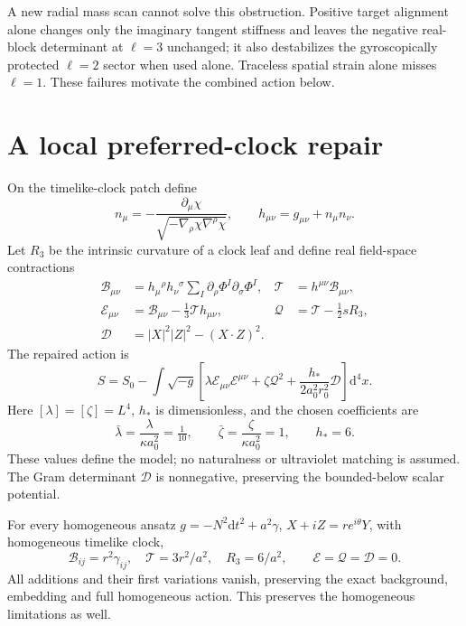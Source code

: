 \documentclass[11pt]{article}
\newcommand{\dd}{\mathrm d}
\numberwithin{equation}{section}
\begin{document}
A new radial mass scan cannot solve this obstruction.
Positive target alignment alone changes only the imaginary tangent stiffness and leaves the negative real-block determinant at $\ell=3$ unchanged; it also destabilizes the gyroscopically protected $\ell=2$ sector when used alone.
Traceless spatial strain alone misses $\ell=1$.
These failures motivate the combined action below.

\section{A local preferred-clock repair}

On the timelike-clock patch define
\begin{equation}
 n_\mu=-\frac{\partial_\mu\chi}{\sqrt{-\nabla_\rho\chi\nabla^\rho\chi}},\qquad
 h_{\mu\nu}=g_{\mu\nu}+n_\mu n_\nu.
\end{equation}
Let $R_3$ be the intrinsic curvature of a clock leaf and define real field-space contractions
\begin{align}
 \mathcal B_{\mu\nu}&=h_\mu{}^\rho h_\nu{}^\sigma\sum_I\partial_\rho\Phi^I\partial_\sigma\Phi^I,
 &\mathcal T&=h^{\mu\nu}\mathcal B_{\mu\nu},\\
 \mathcal E_{\mu\nu}&=\mathcal B_{\mu\nu}-\tfrac13\mathcal T h_{\mu\nu},
 &\mathcal Q&=\mathcal T-\tfrac12sR_3,\\
 \mathcal D&=|X|^2|Z|^2-(X\cdot Z)^2.&&
\end{align}
The repaired action is
\begin{equation}
 S=S_0-\int\sqrt{-g}\left[\lambda\mathcal E_{\mu\nu}\mathcal E^{\mu\nu}
 +\zeta\mathcal Q^2+\frac{h_*}{2a_0^2r_0^2}\mathcal D\right]\dd^4x.
 \label{eq:newaction}
\end{equation}
Here $[\lambda]=[\zeta]=L^4$, $h_*$ is dimensionless, and the chosen coefficients are
\begin{equation}
 \bar\lambda=\frac\lambda{\kappa a_0^2}=\tfrac1{10},\qquad
 \bar\zeta=\frac\zeta{\kappa a_0^2}=1,\qquad h_*=6.
 \label{eq:repairpoint}
\end{equation}
These values define the model; no naturalness or ultraviolet matching is assumed.
The Gram determinant $\mathcal D$ is nonnegative, preserving the bounded-below scalar potential.

For every homogeneous ansatz $g=-N^2\dd t^2+a^2\gamma$, $X+iZ=re^{i\theta}Y$, with homogeneous timelike clock,
\begin{equation}
 \mathcal B_{ij}=r^2\gamma_{ij},\quad \mathcal T=3r^2/a^2,\quad R_3=6/a^2,
 \qquad\mathcal E=\mathcal Q=\mathcal D=0.
\end{equation}
All additions and their first variations vanish, preserving the exact background, embedding and full homogeneous action.
This preserves the homogeneous limitations as well.
\end{document}
